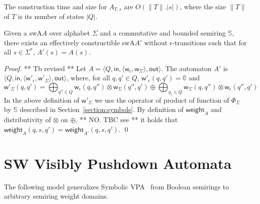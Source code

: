 \documentclass[runningheads]{llncs}
\def\<#1>{\langle #1 \rangle}
\newcommand{\Semiring}{\mathbb{S}}
\newcommand{\zero}{\mathbb{0}}
\def\SWA{\textsf{swA}\xspace}
\def\weight{\mathsf{weight}}
\def\wei{\mathsf{w}}
\def\init{\mathsf{in}}
\def\final{\mathsf{out}}
\begin{document}
The construction time and size for $A_{T, s}$ are $O(\| T \| . | s |)$,
where the size $\| T \|$ of $T$ is its number of states $|Q|$.


\begin{proposition}
Given a \SWA $A$ over alphabet $\Sigma$ 
and a commutative and bounded semiring $\Semiring$, 
there exists an effectively constructible \SWA $A'$ 
without $\epsilon$-transitions 
such that for all $s \in \Sigma^*$, $A'(s) = A(s)$.
\end{proposition}
%
\begin{proof}  ** Tb revised **   
Let $A = \< Q, \init, \<\wei_\epsilon, \wei_\Sigma>, \final >$.
The automaton $A'$ is $\< Q, \init, \<\wei'_\epsilon, \wei'_\Sigma>, \final >$,
where, for all $q, q' \in Q$,
$\wei'_\epsilon(q, q') = \zero$  
and 
\[
\wei'_\Sigma(q, q') = 
\displaystyle\bigoplus_{q'' \in Q} \wei_\epsilon(q, q'') \otimes \wei_\Sigma(q'', q')
\oplus \displaystyle\bigoplus_{q_1 \in Q} \wei_\Sigma(q, q'') \otimes \wei_\epsilon(q'', q')
\]
In the above definition of $\wei'_\Sigma$ we use the operator
of product of function of $\Phi_\Sigma$ by $\Semiring$ 
described in Section~\ref{section:symbols}.
%
By definition of $\weight_{A}$ and distributivity of $\otimes$ on $\oplus$, 
** NO. TBC see \cite{Mohri02ijfcs} **
it holds that $\weight_{A}(q, s, q') = \weight_{A'}(q, s, q')$.
\qed
\end{proof}     





\section{SW Visibly Pushdown Automata}
\label{section:SWVPA}\label{sec:SWVPA}
The following model generalizes Symbolic VPA~\cite{dAntonyAlur14SVPDA}
from Boolean semirings to arbitrary semiring weight domains.
\end{document}
